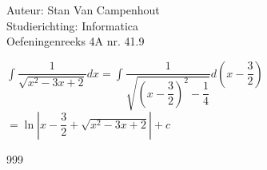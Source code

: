 \documentclass[a4paper]{article}
\begin{document}
  
\noindent \large Auteur: Stan Van Campenhout \\
\noindent \large Studierichting:  Informatica\\
\noindent \large Oefeningenreeks 4A nr. 41.9\\

\medskip

\normalsize

$ \displaystyle\int\dfrac{1}{\sqrt{x^2 -3x + 2}}dx = \displaystyle\int\dfrac{1}{\sqrt{\left(x-\dfrac{3}{2}\right)^2 - \dfrac{1}{4}}}d\left(x-\dfrac{3}{2}\right) $\\

$ = \ln\left|x-\dfrac{3}{2} + \sqrt{x^2 -3x + 2}\right| + c $\\

\begin{thebibliography}{999}
\end{thebibliography}
\end{document}
